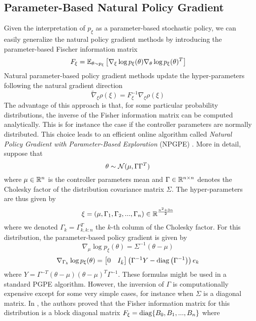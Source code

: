 \subsection{Parameter-Based Natural Policy Gradient}
Given the interpretation of $p_\xi$ as a parameter-based stochastic policy, we can easily generalize the natural policy gradient methods by introducing the parameter-based Fischer information matrix
\begin{equation}
	F_\xi = \E[\theta\sim p_\xi]{\nabla_\xi\log p_\xi(\theta) \nabla_\theta\log p_\xi(\theta)^T}
\end{equation}
Natural parameter-based policy gradient methods update the hyper-parameters following the natural gradient direction 
\begin{equation}
	\widetilde{\nabla}_\xi \rho(\xi) = F_\xi^{-1} \nabla_\xi \rho(\xi)
\end{equation}
The advantage of this approach is that, for some particular probability distributions, the inverse of the Fisher information matrix can be computed analytically. This is for instance the case if the controller parameters are normally distributed. This choice leads to an efficient online algorithm called \emph{Natural Policy Gradient with Parameter-Based Exploration} (NPGPE) \cite{miyamae2010natural}. More in detail, suppose that
\begin{equation*}
	\theta \sim \calN(\mu, \Gamma \Gamma^T)
\end{equation*} 
where $\mu\in\R^n$ is the controller parameters mean and $\Gamma \in \R^{n\times n}$ denotes the Cholesky factor of the distribution covariance matrix $\Sigma$. The hyper-parameters are thus given by 
\begin{equation*}
	\xi = (\mu, \Gamma_1, \Gamma_2, ... , \Gamma_n) \in \R^\frac{n^2 + 3n}{2}
\end{equation*}
where we denoted $\Gamma_k = \Gamma_{k,k:n}^T$ the $k$-th column of the Cholesky factor. For this distribution, the parameter-based policy gradient is given by
\begin{equation}
	\nabla_\mu \log p_\xi(\theta) = \Sigma^{-1} (\theta - \mu)
\end{equation}
\begin{equation}
	\nabla_{\Gamma_k} \log p_\xi(\theta) = \begin{bmatrix} 0 & I_{\bar{k}} \end{bmatrix} \left(\Gamma^{-1} Y - \diag\left(\Gamma^{-1}\right)\right) e_k
\end{equation}
where $Y = \Gamma^{-T} (\theta - \mu) (\theta - \mu)^T \Gamma^{-1}$. These formulas might be used in a standard PGPE algorithm. However, the inversion of $\Gamma$ is computationally expensive except for some very simple cases, for instance when $\Sigma$ is a diagonal matrix. In \cite{sun2009efficient}, the authors proved that the Fisher information matrix for this distribution is a block diagonal matrix $F_\xi = \diag\{B_0, B_1, ..., B_n\}$ where
